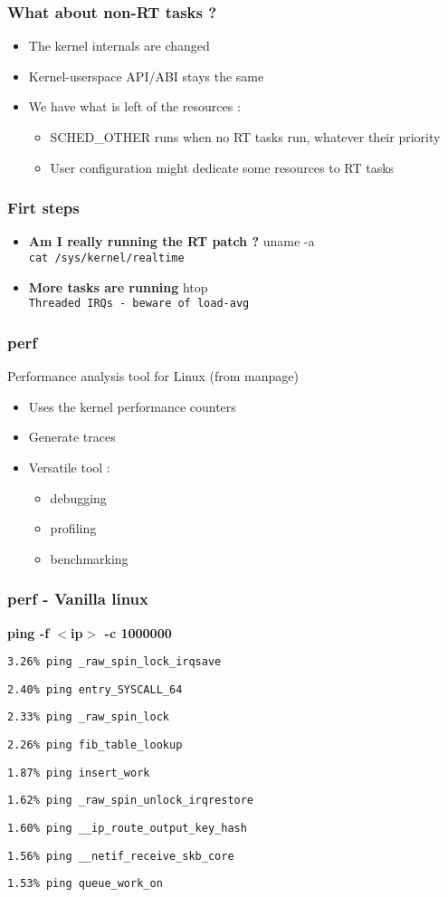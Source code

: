 \begin{frame}
	\frametitle{What about non-RT tasks ?}
	\begin{itemize}
		\item The kernel internals are changed
		\item Kernel-userspace API/ABI stays the same
		\item We have what is left of the resources :
			\begin{itemize}
				\item SCHED\_OTHER runs when no RT tasks run, whatever their priority
				\item User configuration might dedicate some resources to RT tasks
			\end{itemize}
	\end{itemize}
\end{frame}

\begin{frame}
	\frametitle{Firt steps}
	\begin{itemize}
		\item \textbf{Am I really running the RT patch ?} uname -a \\ \small{\texttt{cat /sys/kernel/realtime}}
		\item \textbf{More tasks are running} htop \\ \small{\texttt{Threaded IRQs - beware of load-avg}}
	\end{itemize}
\end{frame}

\begin{frame}
	\frametitle{perf}
	Performance analysis tool for Linux (from manpage)
	\begin{itemize}
		\item Uses the kernel performance counters
		\item Generate traces
		\item Versatile tool :
			\begin{itemize}
				\item debugging
				\item profiling
				\item benchmarking
			\end{itemize}
	\end{itemize}
\end{frame}

\begin{frame}
	\frametitle{perf - Vanilla linux}
	\textbf{ping -f $<$ip$>$ -c 1000000}

\texttt{3.26\%  ping  \_raw\_spin\_lock\_irqsave}

\texttt{2.40\%  ping  entry\_SYSCALL\_64}

\texttt{2.33\%  ping  \_raw\_spin\_lock}

\texttt{2.26\%  ping  fib\_table\_lookup}

\texttt{1.87\%  ping  insert\_work}

\texttt{1.62\%  ping  \_raw\_spin\_unlock\_irqrestore}

\texttt{1.60\%  ping  \_\_ip\_route\_output\_key\_hash}

\texttt{1.56\%  ping  \_\_netif\_receive\_skb\_core}

\texttt{1.53\%  ping  queue\_work\_on}
\end{frame}


